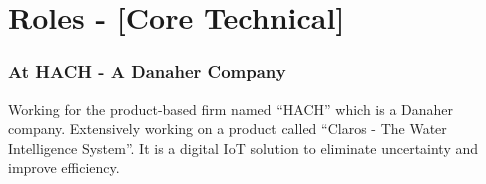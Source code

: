 \documentclass[11pt, a4paper]{article}
\begin{document}
\section*{\color{NavyBlue}Roles - [Core Technical]}
\vspace{-1.5mm}
\subsubsection*{\textcolor{NavyBlue}{\faBuilding}\hspace{0.1pt} At HACH - A Danaher Company}
\vspace{-1.5mm}
Working for the product-based firm named “HACH” which is a Danaher company.  Extensively working on a product called “Claros - The Water Intelligence System”. It is a digital IoT solution to eliminate uncertainty and improve efficiency. \\
\end{document}
